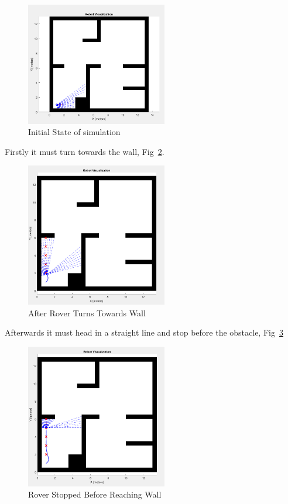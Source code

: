 \begin{figure}[!htbp]
\centering
       \includegraphics[page=1,width=0.55\textwidth]{img/startState.png} 
\caption{Initial State of simulation}
\label{fig:iniState}
\end{figure}

Firstly it must turn towards the wall, Fig~\ref{fig:sim1Turn}.
\begin{figure}[!htbp]
\centering
       \includegraphics[page=1,width=0.55\textwidth]{img/line2.png} 
\caption{After Rover Turns Towards Wall}
\label{fig:sim1Turn}
\end{figure}

Afterwards it must head in a straight line and stop before the obstacle, Fig~\ref{fig:sim2Line}

\begin{figure}[!htbp]
\centering
       \includegraphics[page=1,width=0.55\textwidth]{img/line3.png} 
\caption{Rover Stopped Before Reaching Wall}
\label{fig:sim2Line}
\end{figure}

